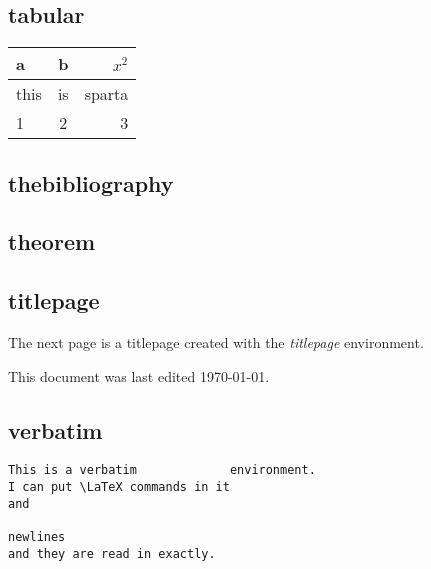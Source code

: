 \documentclass[11pt]{article}
\begin{document}
\subsection{tabular}
\begin{tabular}[h]{l|cr}
    a & b & $x^2$\\\hline
    this & is & sparta\\
    1 & 2 & 3
\end{tabular}


\subsection{thebibliography}%

\subsection{theorem} %

\subsection{titlepage}
The next page is a titlepage created with the \emph{titlepage} environment.
\begin{titlepage}
    This document was last edited \today.
\end{titlepage}

\subsection{verbatim}%
\begin{verbatim}
This is a verbatim             environment.
I can put \LaTeX commands in it
and

newlines
and they are read in exactly.
\end{verbatim}
\end{document}
